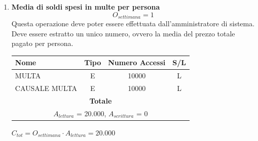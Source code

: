\documentclass[12pt,a4paper]{report}
\begin{document}
\begin{enumerate}[label=\textbf{\arabic*}]
         \item\textbf{Media di soldi spesi in multe per persona} \label{op16} \\
	\[{O_{settimana} = 1}\]
	Questa operazione deve poter essere effettuata dall'amministratore di sistema.\\
	Deve essere estratto un unico numero, ovvero la media del prezzo totale pagato per persona.
	\begin{table}[H]
	\centering
	\begin{tabular}{|l|c|c|c|}
	\hline
	Nome & Tipo & Numero Accessi & S/L \\
	\hline
	MULTA & E & 10000 & L \\
	\hline
	CAUSALE MULTA & E & 10000 & L \\
	    \hline
	    \multicolumn{4}{c}{\textbf{Totale}} \\
	    \multicolumn{4}{c}{${A_{lettura}}$ = 20.000, ${A_{scrittura}}$ = 0} \\
	    \hline
	    \end{tabular}
	    \end{table}
	    \begin{center}
	    ${C_{tot} = {O_{settimana}}\cdot{A_{lettura}}= 20.000}$
	    \end{center}



\end{enumerate}
\end{document}
